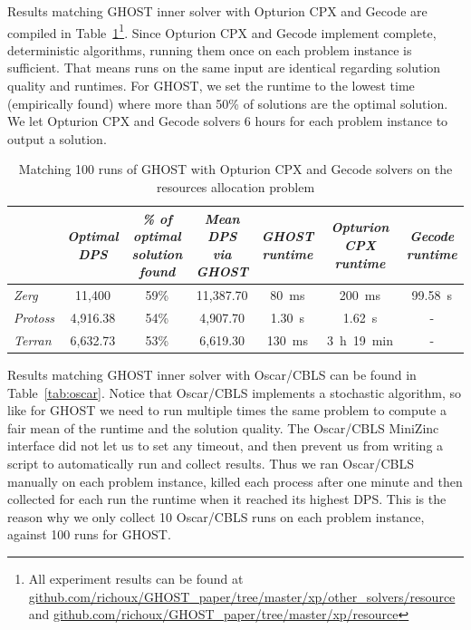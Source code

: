 \documentclass[journal]{IEEEtran}
\newcommand{\ghost}{\textsc{GHOST}\xspace}
\begin{document}
Results matching \ghost inner solver  with Opturion CPX and Gecode are
compiled  in  Table~\ref{tab:SOTA}\footnote{All  experiment results can     be     found     at
  \href{https://github.com/richoux/GHOST\_paper/tree/master/xp/other\_solvers/resource}{github.com/richoux/GHOST\_paper/tree/master/xp/other\_solvers/resource}
  and \href{https://github.com/richoux/GHOST\_paper/tree/master/xp/resource}{github.com/richoux/GHOST\_paper/tree/master/xp/resource}}.
Since Opturion CPX and Gecode
implement complete,  deterministic algorithms,  running them  once on
each  problem instance  is  sufficient. That means  runs on  the  same input  are
identical regarding solution quality and  runtimes. For \ghost, we set
the runtime  to the  lowest time (empirically  found) where  more than
50\% of solutions  are the optimal solution.  We let  Opturion CPX and
Gecode solvers 6 hours for each problem instance to output a solution.

\begin{table}[ht]
  \caption{Matching 100  runs of \ghost  with Opturion CPX  and Gecode
    solvers on the resources allocation problem}
    \label{tab:SOTA}
    \centering
    \begin{tabular}{|l|c|c|c|c|c|c|}
      \cline{2-7}
      \multicolumn{1}{c|}{} &  {\em Optimal  DPS}& {\em \%  of optimal
        solution found}
      & {\em Mean DPS via \ghost}& {\em \ghost runtime}
      & {\em Opturion CPX runtime}& {\em Gecode runtime} \\
      \hline
      {\em Zerg} & 11,400 & 59\% & 11,387.70 & 80~ms & 200~ms & 99.58~s\\
      {\em Protoss} & 4,916.38 & 54\% & 4,907.70 & 1.30~s & 1.62~s & - \\
      {\em Terran} & 6,632.73 & 53\% & 6,619.30 & 130~ms & 3~h~19~min & - \\
      \hline
    \end{tabular}
\end{table}

Results matching \ghost  inner solver with Oscar/CBLS can  be found in
Table~\ref{tab:oscar}. Notice that  Oscar/CBLS implements a stochastic
algorithm,  so  like  for  \ghost   we  need  to  run  multiple  times
  the same problem  to compute a fair mean of the
runtime and  the solution quality.
The  Oscar/CBLS MiniZinc interface
did not let us to set any  timeout, and then prevent us from writing a
script to  automatically run  and collect  results.
Thus we  ran Oscar/CBLS
manually  on each  problem  instance, killed  each  process after  one
minute and then collected for each run the runtime when it reached its highest
DPS. This is the reason why we only collect 10 Oscar/CBLS runs on each
problem instance, against 100 runs for \ghost.
\end{document}
